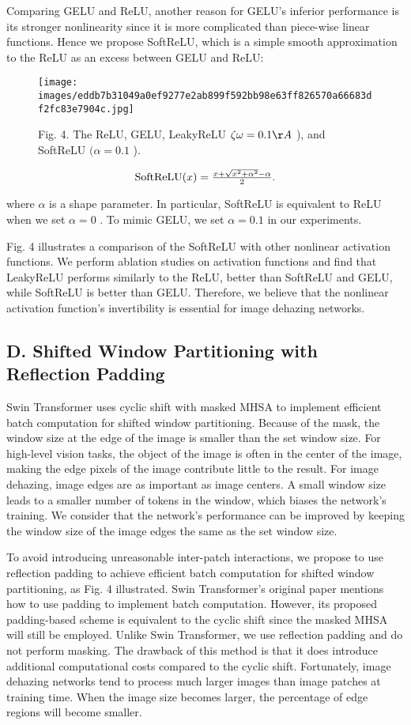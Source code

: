 \documentclass{article}
\begin{document}
Comparing GELU and ReLU, another reason for GELU’s inferior performance is its stronger nonlinearity since it is more complicated than piece-wise linear functions. Hence we propose SoftReLU, which is a simple smooth approximation to the ReLU as an excess between GELU and ReLU:


\begin{figure}[htbp]
\centering
\texttt{[image: images/eddb7b31049a0ef9277e2ab899f592bb98e63ff826570a66683df2fc83e7904c.jpg]}
\caption{Fig. 4. The ReLU, GELU, LeakyReLU $\zeta\omega=0.1\AA$ ), and SoftReLU $(\alpha=0.1 $  ).}
\end{figure}


\[
$$$$\mathrm{SoftReLU}(x)=\frac{x+\sqrt{x^{2}+\alpha^{2}}-\alpha}{2}.
\]


where $\alpha$ is a shape parameter. In particular, SoftReLU is equivalent to ReLU when we set $\alpha=0$ . To mimic GELU, we set $\alpha=0.1$ in our experiments.


Fig. 4 illustrates a comparison of the SoftReLU with other nonlinear activation functions. We perform ablation studies on activation functions and find that LeakyReLU performs similarly to the ReLU, better than SoftReLU and GELU, while SoftReLU is better than GELU. Therefore, we believe that the nonlinear activation function’s invertibility is essential for image dehazing networks.


\subsection{D. Shifted Window Partitioning with Reflection Padding}


Swin Transformer uses cyclic shift with masked MHSA to implement efficient batch computation for shifted window partitioning. Because of the mask, the window size at the edge of the image is smaller than the set window size. For high-level vision tasks, the object of the image is often in the center of the image, making the edge pixels of the image contribute little to the result. For image dehazing, image edges are as important as image centers. A small window size leads to a smaller number of tokens in the window, which biases the network’s training. We consider that the network’s performance can be improved by keeping the window size of the image edges the same as the set window size.


To avoid introducing unreasonable inter-patch interactions, we propose to use reflection padding to achieve efficient batch computation for shifted window partitioning, as Fig. 4 illustrated. Swin Transformer’s original paper mentions how to use padding to implement batch computation. However, its proposed padding-based scheme is equivalent to the cyclic shift since the masked MHSA will still be employed. Unlike Swin Transformer, we use reflection padding and do not perform masking. The drawback of this method is that it does introduce additional computational costs compared to the cyclic shift. Fortunately, image dehazing networks tend to process much larger images than image patches at training time. When the image size becomes larger, the percentage of edge regions will become smaller.
\end{document}
